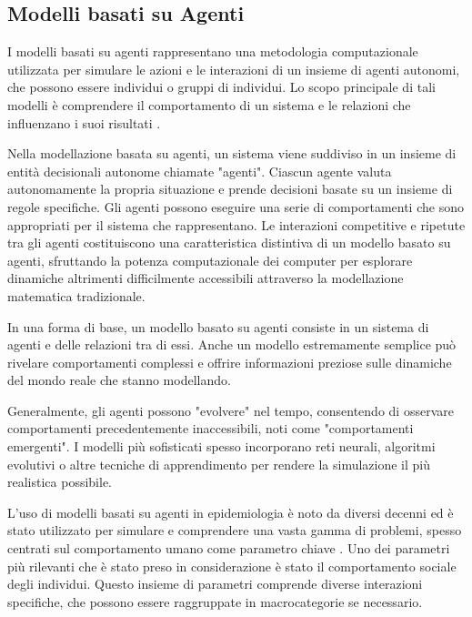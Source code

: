 \subsection{Modelli basati su Agenti}

I modelli basati su agenti rappresentano una metodologia computazionale 
utilizzata per simulare le azioni e le interazioni di un insieme di agenti 
autonomi, che possono essere individui o gruppi di individui. 
Lo scopo principale di tali modelli è comprendere il comportamento di un 
sistema e le relazioni che influenzano i suoi risultati \cite{7822080}.

Nella modellazione basata su agenti, un sistema viene suddiviso in un 
insieme di entità decisionali autonome chiamate "agenti". Ciascun agente 
valuta autonomamente la propria situazione e prende decisioni basate su 
un insieme di regole specifiche. Gli agenti possono eseguire una serie 
di comportamenti che sono appropriati per il sistema che rappresentano. 
Le interazioni competitive e ripetute tra gli agenti costituiscono una 
caratteristica distintiva di un modello basato su agenti, sfruttando la 
potenza computazionale dei computer per esplorare dinamiche altrimenti 
difficilmente accessibili attraverso la modellazione matematica tradizionale.

In una forma di base, un modello basato su agenti consiste in un sistema 
di agenti e delle relazioni tra di essi. Anche un modello estremamente 
semplice può rivelare comportamenti complessi e offrire informazioni 
preziose sulle dinamiche del mondo reale che stanno modellando.

Generalmente, gli agenti possono "evolvere" nel tempo, consentendo di 
osservare comportamenti precedentemente inaccessibili, noti come 
"comportamenti emergenti". I modelli più sofisticati spesso incorporano 
reti neurali, algoritmi evolutivi o altre tecniche di apprendimento per 
rendere la simulazione il più realistica possibile.

L'uso di modelli basati su agenti in epidemiologia è noto da diversi 
decenni ed è stato utilizzato per simulare e comprendere una vasta gamma 
di problemi, spesso centrati sul comportamento umano come parametro chiave 
\cite{Groff2019} \cite{El-Sayed2012-ac} \cite{Tracy2018-lc} \cite{Bissett2021}. 
Uno dei parametri più rilevanti che è stato preso in considerazione è 
stato il comportamento sociale degli individui. Questo insieme di 
parametri comprende diverse interazioni specifiche, che possono essere 
raggruppate in macrocategorie se necessario.

